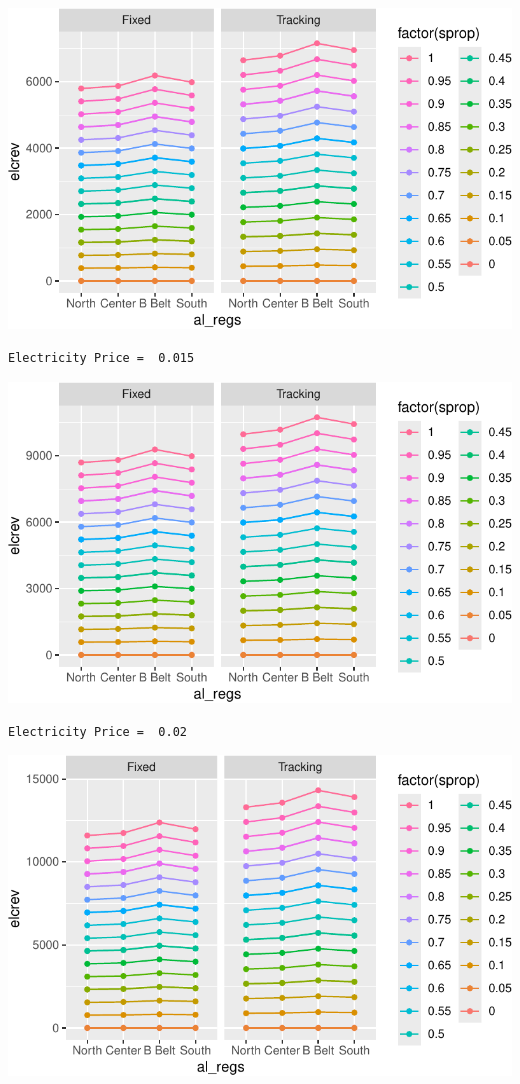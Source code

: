 \documentclass[
  letterpaper,
  DIV=11,
  numbers=noendperiod]{scrartcl}
\begin{document}
\includegraphics{Simulation_files/figure-pdf/unnamed-chunk-21-1.pdf}

\begin{verbatim}
Electricity Price =  0.015
\end{verbatim}

\includegraphics{Simulation_files/figure-pdf/unnamed-chunk-21-2.pdf}

\begin{verbatim}
Electricity Price =  0.02
\end{verbatim}

\includegraphics{Simulation_files/figure-pdf/unnamed-chunk-21-3.pdf}
\end{document}
